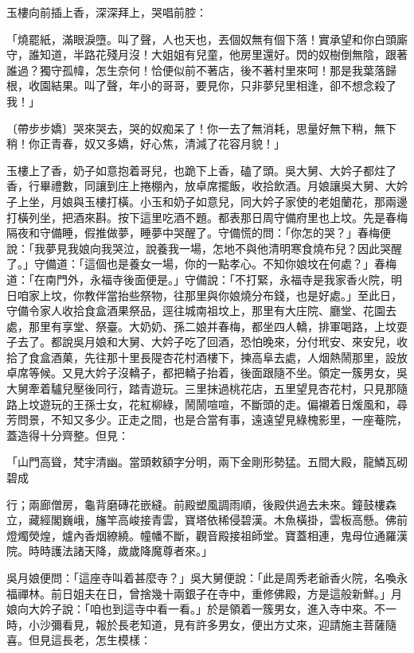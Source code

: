 \begin{showcontents}{}
玉樓向前插上香，深深拜上，哭唱前腔：

「燒罷紙，滿眼淚墮。叫了聲，人也天也，丟個奴無有個下落！實承望和你白頭廝守，誰知道，半路花殘月沒！大姐姐有兒童，他房里還好。閃的奴樹倒無陰，跟著誰過？獨守孤幃，怎生奈何！恰便似前不著店，後不著村里來呵！那是我葉落歸根，收園結果。叫了聲，年小的哥哥，要見你，只非夢兒里相逢，卻不想念殺了我！」

〔帶步步嬌〕哭來哭去，哭的奴痴呆了！你一去了無消耗，思量好無下稍，無下稍！你正青春，奴又多嬌，好心焦，清減了花容月貌！」

玉樓上了香，奶子如意抱着哥兒，也跪下上香，磕了頭。吳大舅、大妗子都炷了香，行畢禮數，同讓到庄上捲棚內，放卓席擺飯，收拾飲酒。月娘讓吳大舅、大妗子上坐，月娘與玉樓打橫。小玉和奶子如意兒，同大妗子家使的老姐蘭花，那兩邊打橫列坐，把酒來斟。按下這里吃酒不題。都表那日周守備府里也上坟。先是春梅隔夜和守備睡，假推做夢，睡夢中哭醒了。守備慌的問：「你怎的哭？」春梅便說：「我夢見我娘向我哭泣，說養我一場，怎地不與他清明寒食燒布兒？因此哭醒了。」守備道：「這個也是養女一場，你的一點孝心。不知你娘坟在何處？」春梅道：「在南門外，永福寺後面便是。」守備說：「不打緊，永福寺是我家香火院，明日咱家上坟，你教伴當抬些祭物，往那里與你娘燒分布錢，也是好處。」至此日，守備令家人收拾食盒酒果祭品，逕往城南祖坟上，那里有大庄院、廳堂、花園去處，那里有享堂、祭臺。大奶奶、孫二娘并春梅，都坐四人轎，排軍喝路，上坟耍子去了。都說吳月娘和大舅、大妗子吃了回酒，恐怕晚來，分付玳安、來安兒，收拾了食盒酒菓，先往那十里長隄杏花村酒樓下，揀高阜去處，人烟熱鬧那里，設放卓席等候。又見大妗子沒轎子，都把轎子抬着，後面跟隨不坐。領定一簇男女，吳大舅牽着驢兒壓後同行，踏青遊玩。三里抹過桃花店，五里望見杏花村，只見那隨路上坟遊玩的王孫士女，花紅柳綠，鬧鬧喧喧，不斷頭的走。偏襯着日煖風和，尋芳問景，不知又多少。正走之間，也是合當有事，遠遠望見綠槐影里，一座菴院，蓋造得十分齊整。但見：

「山門高聳，梵宇清幽。當頭敕額字分明，兩下金剛形勢猛。五間大殿，龍鱗瓦砌碧成

行；兩廊僧房，龜背磨磚花嵌縫。前殿塑風調雨順，後殿供過去未來。鐘鼓樓森立，藏經閣巍峨，旛竿高峻接青雲，寶塔依稀侵碧漢。木魚橫掛，雲板高懸。佛前燈燭熒煌，爐內香烟繚繞。幢幡不斷，觀音殿接祖師堂。寶蓋相連，鬼母位通羅漢院。時時護法諸天降，歲歲降魔尊者來。」

吳月娘便問：「這座寺叫着甚麼寺？」吳大舅便說：「此是周秀老爺香火院，名喚永福禪林。前日姐夫在日，曾捨幾十兩銀子在寺中，重修佛殿，方是這般新鮮。」月娘向大妗子說：「咱也到這寺中看一看。」於是領着一簇男女，進入寺中來。不一時，小沙彌看見，報於長老知道，見有許多男女，便出方丈來，迎請施主菩薩隨喜。但見這長老，怎生模樣：


\end{showcontents}

